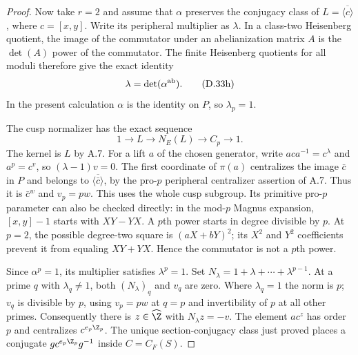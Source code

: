 \begin{proof}
Now take $r=2$ and assume that $\alpha$ preserves the conjugacy
class of $L=\overline{\langle c\rangle}$, where $c=[x,y]$.
Write its peripheral multiplier as $\lambda$.  In a class-two
Heisenberg quotient, the image of the commutator under an
abelianization matrix $A$ is the $\det(A)$ power of the
commutator.  The finite Heisenberg quotients for all moduli
therefore give the exact identity
\[
                        \lambda=\det(\alpha^{\rm ab}).   \tag{D.33h}
\]
In the present calculation $\alpha$ is the identity on $P$,
so $\lambda_p=1$.

The cusp normalizer has the exact sequence
\[
 1\longrightarrow L\longrightarrow N_E(L)
                        \longrightarrow C_p\longrightarrow1.
                                                        \tag{D.33i}
\]
The kernel is $L$ by A.7.  For a lift $a$ of the chosen
generator, write
$aca^{-1}=c^\lambda$ and $a^p=c^v$, so $(\lambda-1)v=0$.
The first coordinate of $\pi(a)$ centralizes the image $\bar c$
in $P$ and belongs to $\overline{\langle\bar c\rangle}$,
by the pro-$p$ peripheral centralizer assertion of A.7.
Thus it is $\bar c^w$ and $v_p=pw$.
This uses the whole cusp subgroup.  Its primitive pro-$p$
parameter can also be checked directly: in the mod-$p$ Magnus
expansion, $[x,y]-1$ starts with $XY-YX$.  A $p$th power
starts in degree divisible by $p$.  At $p=2$, the possible
degree-two square is $(aX+bY)^2$; its $X^2$ and $Y^2$
coefficients prevent it from equaling $XY+YX$.  Hence the
commutator is not a $p$th power.

Since $\alpha^p=1$, its multiplier satisfies $\lambda^p=1$.
Set $N_\lambda=1+\lambda+\cdots+\lambda^{p-1}$.
At a prime $q$ with $\lambda_q\ne1$, both
$(N_\lambda)_q$ and $v_q$ are zero.  Where $\lambda_q=1$
the norm is $p$; $v_q$ is divisible by $p$, using $v_p=pw$
at $q=p$ and invertibility of $p$ at all other primes.
Consequently there is $z\in\widehat\Z$ with
$N_\lambda z=-v$.  The element $ac^z$ has order $p$
and centralizes $c^{e_p\Z_p}$.
The unique section-conjugacy class just proved places a
conjugate $g c^{e_p\Z_p}g^{-1}$ inside
$C=C_F(S)$.


\end{proof}
